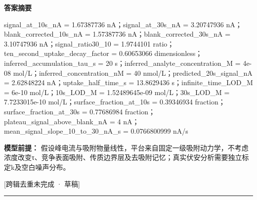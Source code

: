 \documentclass[UTF8,11pt,a4paper]{ctexart}
\begin{document}
\noindent\textbf{答案摘要}\par
signal\_at\_10s\_nA = 1.67387736 nA；signal\_at\_30s\_nA = 3.20747936 nA；blank\_corrected\_10s\_nA = 1.57387736 nA；blank\_corrected\_30s\_nA = 3.10747936 nA；signal\_ratio30\_10 = 1.9744101 ratio；ten\_second\_uptake\_decay\_factor = 0.60653066 dimensionless；inferred\_accumulation\_tau\_s = 20 s；inferred\_analyte\_concentration\_M = 4e-08 mol/L；inferred\_concentration\_nM = 40 nmol/L；predicted\_20s\_signal\_nA = 2.62848224 nA；uptake\_half\_time\_s = 13.8629436 s；infinite\_time\_LOD\_M = 6e-10 mol/L；10s\_LOD\_M = 1.52489645e-09 mol/L；30s\_LOD\_M = 7.7233015e-10 mol/L；surface\_fraction\_at\_10s = 0.39346934 fraction；surface\_fraction\_at\_30s = 0.77686984 fraction；plateau\_signal\_above\_blank\_nA = 4 nA；mean\_signal\_slope\_10\_to\_30\_nA\_s = 0.0766800999 nA/s\par
\noindent\textbf{模型前提：}
假设峰电流与吸附物量线性，平台来自固定一级吸附动力学，不考虑浓度改变τ、竞争表面吸附、传质边界层及去吸附记忆；真实伏安分析需要独立标定k及空白噪声分布。\par
\noindent\textcolor{red!65!black}{[跨辑去重未完成 · 草稿]} \par
\medskip\hrule\medskip
{}
\end{document}
